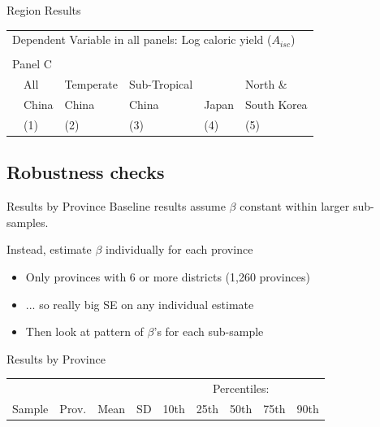 \documentclass[10pt, xcolor=dvipsnames]{beamer}
\begin{document}
\begin{frame}{Region Results}

{\footnotesize
\begin{tabularx}{\textwidth}{lXXXXX}
\midrule
\multicolumn{6}{l}{Dependent Variable in all panels: Log caloric yield ($A_{isc}$)} \\ \\
\multicolumn{6}{l}{Panel C} \\
 & All& Temperate & Sub-Tropical & & North \& \\
 & China & China  & China & Japan & South Korea  \\
 & (1) & (2) & (3) & (4) & (5) \\
\midrule

\midrule
\end{tabularx}
}

\end{frame}

\subsection{Robustness checks}

\begin{frame}{Results by Province}\label{prov}
Baseline results assume $\beta$ constant within larger sub-samples. 

\vspace{.2cm}Instead, estimate $\beta$ individually for each province
\begin{itemize}
  \item Only provinces with 6 or more districts (1,260 provinces)
  \item ... so really big SE on any individual estimate
  \item Then look at pattern of $\beta$'s for each sub-sample
\end{itemize}
\end{frame}

\begin{frame}{Results by Province}

{\footnotesize
\begin{tabularx}{\textwidth}{lrrrXXXXX}
\midrule
           &       &      &     & \multicolumn{5}{c}{Percentiles:} \\ \cmidrule{5-9}
Sample & Prov. & Mean & SD  & 10th    & 25th    & 50th & 75th & 90th \\
\midrule

\midrule
\end{tabularx}
}

\hfill \hyperlink{robustness}{}
\end{frame}
\end{document}
